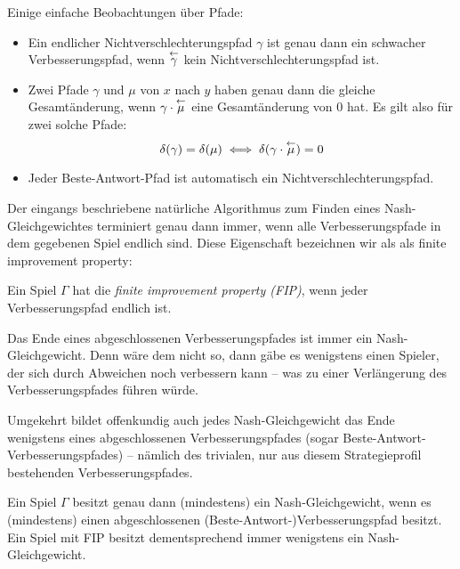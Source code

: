 \begin{beob}\label{beob:Pfade}
	Einige einfache Beobachtungen über Pfade:
	\begin{itemize}
		\item Ein endlicher Nichtverschlechterungspfad $\gamma$ ist genau dann ein schwacher Verbesserungspfad, wenn $\overset{\leftarrow}{\gamma}$ kein Nichtverschlechterungspfad ist. 
		
		\item Zwei Pfade $\gamma$ und $\mu$ von $x$ nach $y$ haben genau dann die gleiche Gesamtänderung, wenn $\gamma\cdot\overset{\leftarrow}{\mu}$ eine Gesamtänderung von $0$ hat. Es gilt also für zwei solche Pfade: 
		\[\delta(\gamma) = \delta(\mu) \iff \delta(\gamma\cdot\overset{\leftarrow}{\mu})=0 \]
		
		\item Jeder Beste-Antwort-Pfad ist automatisch ein Nichtverschlechterungspfad.
	\end{itemize}
\end{beob}

Der eingangs beschriebene natürliche Algorithmus zum Finden eines Nash-Gleichgewichtes terminiert genau dann immer, wenn alle Verbesserungspfade in dem gegebenen Spiel endlich sind. Diese Eigenschaft bezeichnen wir als als finite improvement property:

\begin{defn}
	Ein Spiel $\Gamma$ hat die \emph{finite improvement property (FIP)}, wenn jeder Verbesserungspfad endlich ist.
\end{defn}

\begin{beob}\label{beob:VerbPfadeundNGe}
	Das Ende eines abgeschlossenen Verbesserungspfades ist immer ein Nash-Gleichgewicht. Denn wäre dem nicht so, dann gäbe es wenigstens einen Spieler, der sich durch Abweichen noch verbessern kann -- was zu einer Verlängerung des Verbesserungspfades führen würde. 
		
	Umgekehrt bildet offenkundig auch jedes Nash-Gleichgewicht das Ende wenigstens eines abgeschlossenen Verbesserungspfades (sogar Beste-Antwort-Verbesserungspfades) -- nämlich des trivialen, nur aus diesem Strategieprofil bestehenden Verbesserungspfades.
\end{beob}

\begin{beob}\label{kor:ExVerbPfadExNG}
	Ein Spiel $\Gamma$ besitzt genau dann (mindestens) ein Nash-Gleichgewicht, wenn es (mindestens) einen abgeschlossenen (Beste-Antwort-)Verbesserungspfad besitzt. Ein Spiel mit FIP besitzt dementsprechend immer wenigstens ein Nash-Gleichgewicht.
\end{beob}

